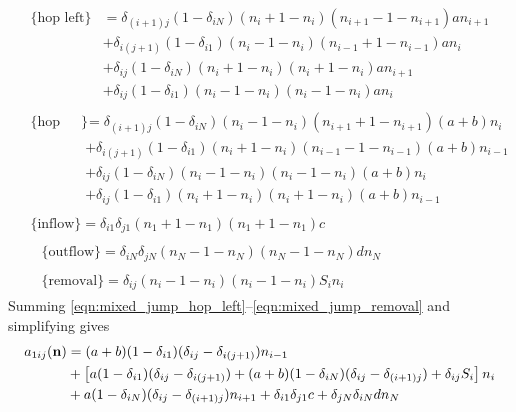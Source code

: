 \begin{align}
    &\begin{aligned}
        \{\text{hop left}\}
        &= \delta_{(i+1)j}(1 - \delta_{iN})(n_i + 1 - n_i)(n_{i+1} - 1 -
        n_{i+1})a n_{i+1}\\
        &+ \delta_{i(j+1)}(1 - \delta_{i1})(n_i - 1 - n_i)(n_{i-1} + 1 -
        n_{i-1})a n_i\\
        &+ \delta_{ij}(1 - \delta_{iN})(n_i + 1 - n_i)(n_i + 1 - n_i)a n_{i+1}\\
        &+ \delta_{ij}(1 - \delta_{i1})(n_i - 1 - n_i)(n_i - 1 - n_i)a n_i
        \label{eqn:mixed_jump_hop_left}
    \end{aligned}\\
    &\begin{aligned}
        \{\text{hop right}\}
        &= \delta_{(i+1)j}(1 - \delta_{iN})(n_i - 1 - n_i)(n_{i+1} + 1 -
        n_{i+1})(a+b) n_i\\
        &+ \delta_{i(j+1)}(1 - \delta_{i1})(n_i + 1 - n_i)(n_{i-1} - 1 -
        n_{i-1})(a+b) n_{i-1}\\
        &+ \delta_{ij}(1 - \delta_{iN})(n_i - 1 - n_i)(n_i - 1 - n_i)(a+b) n_i\\
        &+ \delta_{ij}(1 - \delta_{i1})(n_i + 1 - n_i)(n_i + 1 - n_i)(a+b)
        n_{i-1}
        \label{eqn:mixed_jump_hop_right}
    \end{aligned}\\
    &\begin{aligned}
        \{\text{inflow}\} = \delta_{i1}\delta_{j1} (n_1 + 1 - n_1)(n_1 + 1 -
        n_1)c
        \label{eqn:mixed_jump_inflow}
    \end{aligned}\\
    &\begin{aligned}
        &\{\text{outflow}\} = \delta_{iN}\delta_{jN} (n_N - 1 - n_N)(n_N - 1 - n_N)d
        n_N
        \label{eqn:mixed_jump_outflow}
    \end{aligned}\\
    &\begin{aligned}
        &\{\text{removal}\} = \delta_{ij}(n_i - 1 - n_i)(n_i - 1 - n_i)S_i n_i
        \label{eqn:mixed_jump_removal}
    \end{aligned}
\end{align}
Summing \eqref{eqn:mixed_jump_hop_left}--\eqref{eqn:mixed_jump_removal} and
simplifying gives
\begin{equation}
    \begin{aligned}
        a_{1ij}(\mathbf{n}) &= (a+b)(1-\delta_{i1})(\delta_{ij} -
        \delta_{i(j+1)})n_{i-1}\\
        &+ \left[ a(1-\delta_{i1})(\delta_{ij} -
        \delta_{i(j+1)}) + (a+b)(1-\delta_{iN})(\delta_{ij}-\delta_{(i+1)j}) +
    \delta_{ij}S_i \right]n_i\\
    &+ a(1-\delta_{iN})(\delta_{ij} - \delta_{(i+1)j})n_{i+1} +
    \delta_{i1}\delta_{j1}c + \delta_{jN}\delta_{iN}d n_N
    \end{aligned}
\end{equation}

